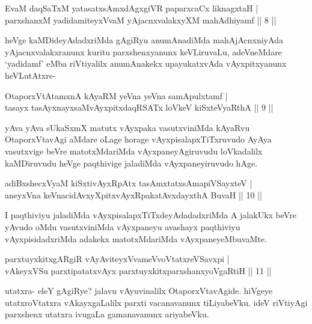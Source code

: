 \begin{shl}
EvaM daqSaTxM yatasatxsAmxdAgxgiVR paparxcaCx liknagxtaH |\\
parxshanxM yadidamiteyxVvaM yAjacnxvalakxyXM mahAdhiyamf \hfill || 8 ||
\end{shl}

\begin{artha}
heVge kaMDideyAdadxriMda gAgiRyu anumAnadiMda mahAjAcnxniyAda yAjacnxvalakxranunx kuritu parxshenxyanunx  keVLiruvaLu, adeVneMdare `yadidamf' eMba riVtiyalilx anumAnakekx upayukatxvAda vAyxpitxyanunx heVLutAtxre-
\end{artha}


\begin{shl}
OtaporxVtAtamxnA kAyaRM yeVna yeVna samApulxtamf |\\
tasayx tasAyxnayxsaMvAyxpitxdaqRSATx loVkeV kiSxteVyaRthA \hfill || 9 ||
\end{shl}

\begin{artha}
yAva yAva sUkaSxmX matutx vAyxpaka vasutxviniMda kAyaRvu OtaporxVtavAgi aMdare oLage horage vAyxpisalapxTiTxruvudo AyAya vasutxvige beVre matotxMda\-riMda vAyxpaneyAgiruvudu loVkadalilx kaMDiruvudu heVge paqthivige jaladiMda vAyxpaneyiruvudo hAge. 
\end{artha}

\begin{shl}
adiBxshecxVyaM kiSxtivAyxRpAtx tasAmxtatxsAmapiVSayxteV |\\
aneyxVna keVnacidAvxyXpitxvAyxRpakatAvxdayxthA BuvaH \hfill || 10 ||
\end{shl}

\begin{artha}
I paqthiviyu jaladiMda vAyxpisalapxTiTxdeyAdadadxriMda A jalakUkx beVre yAvudo oMdu vasutxviniMda vAyxpaneyu avashayx paqthiviyu vAyxpisidadxriMda adakekx matotxMdariMda vAyxpaneyeMbuvaMte.
\end{artha}

\begin{shl}
parxtuyxkitxgARgiR vAyAviteyxVvameVvoVtatxreVSavxpi |\\
vAkeyxVSu parxtipatatxvAyx parxtuyxkitxparxshanxyoVgaRtiH \hfill || 11 ||
\end{shl}

\begin{artha}
utatxra- eleY gAgiRye? jalavu vAyuvinalilx OtaporxVtavAgide. hiVgeye utatxroVtatxra vAkayxgaLalilx parxti vacanavanunx tiLiyabeVku. ideV riVtiyAgi parxshenx utatxra ivugaLa gamanavanunx ariyabeVku.
\end{artha}

